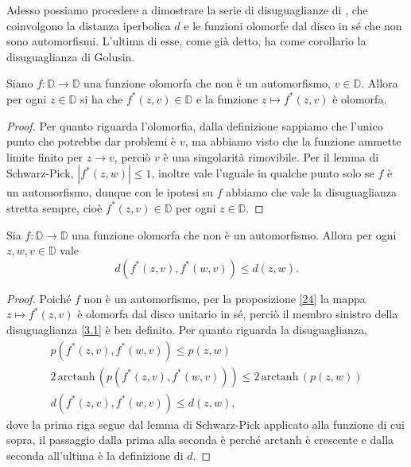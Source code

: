 Adesso possiamo procedere a dimostrare la serie di disuguaglianze di \cite{BM}, che coinvolgono la distanza iperbolica $d$ e le funzioni olomorfe dal disco in sé che non sono automorfismi. L'ultima di esse, come già detto, ha come corollario la disuguaglianza di Golusin.

\begin{prop} \label{24}
  Siano $f:\mathbb{D} \longrightarrow \mathbb{D}$ una funzione olomorfa che non è un automorfismo, $v \in \mathbb{D}$. Allora per ogni $z \in \mathbb{D}$ si ha che $f^*(z,v) \in \mathbb{D}$ e la funzione $z \longmapsto f^*(z,v)$ è olomorfa.
\end{prop}

\begin{proof}
  Per quanto riguarda l'olomorfia, dalla definizione sappiamo che l'unico punto che potrebbe dar problemi è $v$, ma abbiamo visto che la funzione ammette limite finito per $z \longrightarrow v$, perciò $v$ è una singolarità rimovibile. Per il lemma di Schwarz-Pick, $|f^*(z,w)| \le 1$, inoltre vale l'uguale in qualche punto solo se $f$ è un automorfismo, dunque con le ipotesi su $f$ abbiamo che vale la disuguaglianza stretta sempre, cioè $f^*(z,v) \in \mathbb{D}$ per ogni $z \in \mathbb{D}$.
\end{proof}

\begin{thm} \label{31}
  Sia $f:\mathbb{D} \longrightarrow \mathbb{D}$ una funzione olomorfa che non è un automorfismo. Allora per ogni $z, w, v \in \mathbb{D}$ vale
  \begin{equation} \label{3.1}
    d(f^*(z,v),f^*(w,v)) \le d(z,w).
  \end{equation}
\end{thm}

\begin{proof}
  Poiché $f$ non è un automorfismo, per la proposizione \ref{24} la mappa $z \longmapsto f^*(z,v)$ è olomorfa dal disco unitario in sé, perciò il membro sinistro della disuguaglianza \eqref{3.1} è ben definito. Per quanto riguarda la disuguaglianza,
  \begin{align*}
    p(f^*(z,v), f^*(w,v)) \le p(z,w) \\
    2\,\text{arctanh}\,(p(f^*(z,v), f^*(w,v))) \le 2\,\text{arctanh}\,(p(z,w)) \\
    d(f^*(z,v), f^*(w,v)) \le d(z,w),
  \end{align*}
  dove la prima riga segue dal lemma di Schwarz-Pick applicato alla funzione di cui sopra, il passaggio dalla prima alla seconda è perché $\text{arctanh}$ è crescente e dalla seconda all'ultima è la definizione di $d$.
\end{proof}

